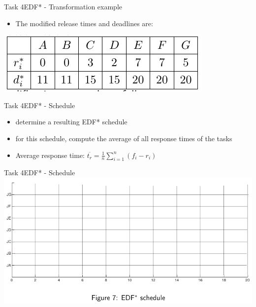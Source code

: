 \begin{frame}{Task 4}{EDF* - Transformation example}
  \begin{itemize}
    \item The modified \alert{release times} and \alert{deadlines} are:
  \end{itemize}
  \centering
 \includegraphics[height=0.2\paperheight]{./figures/4_tab.png}
\end{frame}

\begin{frame}[allowframebreaks]{Task 4}{EDF* - Schedule}
  \begin{tasknoinc}
    \begin{itemize}
      \item determine a resulting EDF* schedule
      \item for this schedule, compute the \alert{average of all response times} of the tasks
    \end{itemize}
  \end{tasknoinc}
  \begin{requirementsnoinc}
    \begin{itemize}
      \item \alert{Average response time:} $\displaystyle \overline{t_r}=\frac{1}{n} \sum_{i=1}^n\left(f_i-r_i\right)$
    \end{itemize}
  \end{requirementsnoinc}
\end{frame}

\begin{frame}{Task 4}{EDF* - Schedule}
    \includegraphics[width = 0.9\linewidth]{figures/EDF-star-schedule.png}
\end{frame}

